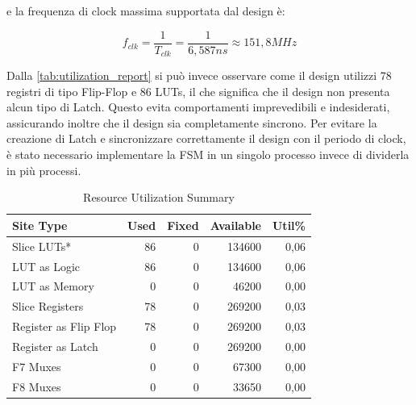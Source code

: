 \documentclass[11pt,a4paper]{article}
\begin{document}
\noindent e la frequenza di clock massima supportata dal design è:

\begin{equation}
    f_{clk} = \frac{1}{T_{clk}} = \frac{1}{6,587 ns} \approx 151,8 MHz
\end{equation}

\vspace{1em}\noindent Dalla \autoref{tab:utilization_report} si può invece osservare come il design utilizzi 78 registri di tipo Flip-Flop e 86 LUTs, il che significa che il design non presenta alcun tipo di Latch. Questo evita comportamenti imprevedibili e indesiderati, assicurando inoltre che il design sia completamente sincrono. Per evitare la creazione di Latch e sincronizzare correttamente il design con il periodo di clock, è stato necessario implementare la FSM in un singolo processo invece di dividerla in più processi.

\begin{table}[ht]
    \centering
    \begin{tabular}{lrrrr}
        \toprule
        \textbf{Site Type}          & \textbf{Used} & \textbf{Fixed} & \textbf{Available} & \textbf{Util\%} \\
        \midrule
        Slice LUTs*                 & 86            & 0              & 134600             & 0,06            \\
        \addlinespace
        \quad LUT as Logic          & 86            & 0              & 134600             & 0,06            \\
        \addlinespace
        \quad LUT as Memory         & 0             & 0              & 46200              & 0,00            \\
        \midrule
        Slice Registers             & 78            & 0              & 269200             & 0,03            \\
        \addlinespace
        \quad Register as Flip Flop & 78            & 0              & 269200             & 0,03            \\
        \addlinespace
        \quad Register as Latch     & 0             & 0              & 269200             & 0,00            \\
        \midrule
        F7 Muxes                    & 0             & 0              & 67300              & 0,00            \\
        \addlinespace
        F8 Muxes                    & 0             & 0              & 33650              & 0,00            \\
        \bottomrule
    \end{tabular}
    \caption{Resource Utilization Summary}
    \label{tab:utilization_report}
\end{table}
\newpage
\end{document}

